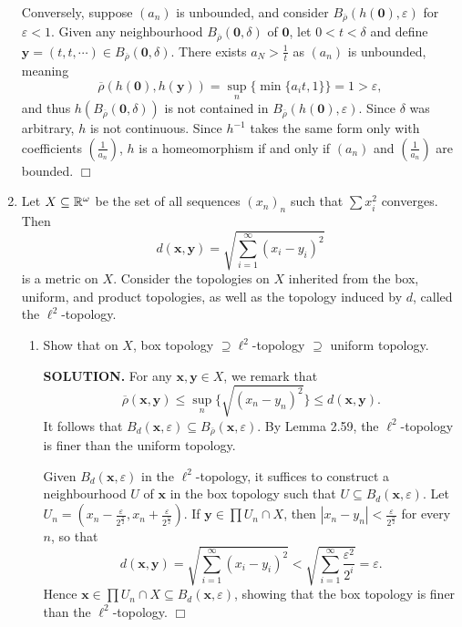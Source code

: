 \documentclass{article}
\begin{document}
\begin{enumerate}
    Conversely, suppose $(a_n)$ is unbounded, and consider $B_{\overline{\rho}}(h(\mathbf{0}), \varepsilon)$ for $\varepsilon < 1$. Given any neighbourhood $B_{\overline{\rho}}(\mathbf{0}, \delta)$ of $\mathbf{0}$, let $0 < t < \delta$ and define $\mathbf{y} = (t, t, \cdots) \in B_{\overline{\rho}}(\mathbf{0}, \delta)$. There exists $a_N > \frac1t$ as $(a_n)$ is unbounded, meaning
    $$\overline{\rho}(h(\mathbf{0}), h(\mathbf{y})) = \sup_n \{\min\{a_i t, 1\}\} = 1 > \varepsilon,$$
    and thus $h(B_{\overline{\rho}}(\mathbf{0}, \delta))$ is not contained in $B_{\overline{\rho}}(h(\mathbf{0}), \varepsilon)$. Since $\delta$ was arbitrary, $h$ is not continuous. Since $h^{-1}$ takes the same form only with coefficients $(\frac{1}{a_n})$, $h$ is a homeomorphism if and only if $(a_n)$ and $(\frac{1}{a_n})$ are bounded. $\Box$

    \item Let $X \subseteq \mathbb{R}^\omega$ be the set of all sequences $(x_n)_n$ such that $\sum x_i^2$ converges. Then
    $$d(\mathbf{x}, \mathbf{y}) = \sqrt{\sum_{i=1}^\infty (x_i-y_i)^2}$$
    is a metric on $X$. Consider the topologies on $X$ inherited from the box, uniform, and product topologies, as well as the topology induced by $d$, called the $\ell^2$-topology.
    \begin{enumerate}
        \item Show that on $X$, box topology $\supseteq \ell^2$-topology $\supseteq$ uniform topology.

        {\bf SOLUTION.} For any $\mathbf{x}, \mathbf{y} \in X$, we remark that
        $$\overline{\rho}(\mathbf{x},\mathbf{y}) \leq \sup_n \{\sqrt{(x_n - y_n)^2}\} \leq d(\mathbf{x}, \mathbf{y}).$$
        It follows that $B_d(\mathbf{x}, \varepsilon) \subseteq B_{\overline{\rho}}(\mathbf{x}, \varepsilon)$. By Lemma 2.59, the $\ell^2$-topology is finer than the uniform topology.

        Given $B_d(\mathbf{x}, \varepsilon)$ in the $\ell^2$-topology, it suffices to construct a neighbourhood $U$ of $\mathbf{x}$ in the box topology such that $U \subseteq B_d(\mathbf{x}, \varepsilon)$. Let $U_n = (x_n - \frac{\varepsilon}{2^\frac{n}{2}}, x_n + \frac{\varepsilon}{2^\frac{n}{2}}).$ If $\mathbf{y} \in \prod U_n \cap X$, then $|x_n - y_n| < \frac{\varepsilon}{2^\frac{n}{2}}$ for every $n$, so that
        $$d(\mathbf{x}, \mathbf{y}) = \sqrt{\sum_{i=1}^\infty (x_i - y_i)^2} < \sqrt{\sum_{i=1}^\infty \frac{\varepsilon^2}{2^{i}}} = \varepsilon.$$
        Hence $\mathbf{x} \in \prod U_n \cap X \subseteq B_d(\mathbf{x}, \varepsilon)$, showing that the box topology is finer than the $\ell^2$-topology. $\Box$


\end{enumerate}
\end{enumerate}
\end{document}
